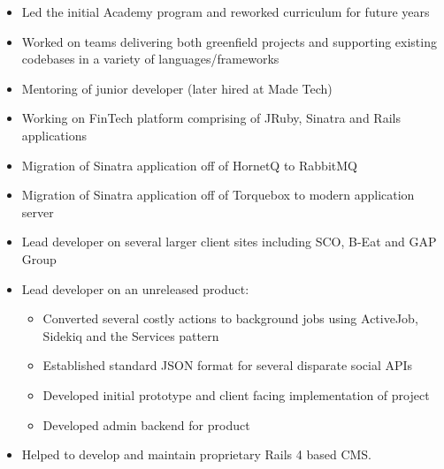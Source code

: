 \documentclass[10pt,a4paper,ragged2e]{altacv}
\begin{document}
\divider

\begin{itemize}
\item Led the initial Academy program and reworked curriculum for future years
\item Worked on teams delivering both greenfield projects and supporting existing codebases in a variety of languages/frameworks
\item Mentoring of junior developer (later hired at Made Tech)
\end{itemize}

\divider

\begin{itemize}
\item Working on FinTech platform comprising of JRuby, Sinatra and Rails applications
\item Migration of Sinatra application off of HornetQ to RabbitMQ
\item Migration of Sinatra application off of Torquebox to modern application server
\end{itemize}

\clearpage

\begin{itemize}
\item Lead developer on several larger client sites including SCO, B-Eat and GAP Group
\item Lead developer on an unreleased product:
\begin{itemize}
\item Converted several costly actions to background jobs using ActiveJob, Sidekiq and the Services pattern
\item Established standard JSON format for several disparate social APIs
\item Developed initial prototype and client facing implementation of project
\item Developed admin backend for product
\end{itemize}
\item Helped to develop and maintain proprietary Rails 4 based CMS.
\end{itemize}

\divider

\end{document}
